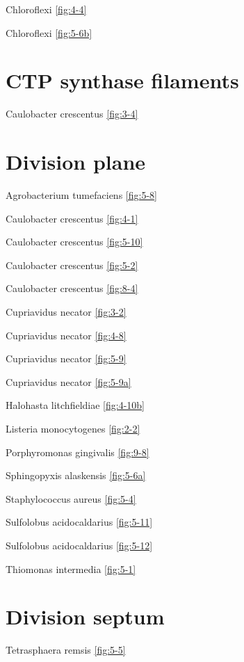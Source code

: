 \documentclass[]{tufte-book}
\begin{document}
Chloroflexi \ref{fig:4-4}

Chloroflexi \ref{fig:5-6b}

\hypertarget{ctp-synthase-filaments}{%
\section*{CTP synthase filaments}\label{ctp-synthase-filaments}}

Caulobacter crescentus \ref{fig:3-4}

\hypertarget{division-plane}{%
\section*{Division plane}\label{division-plane}}

Agrobacterium tumefaciens \ref{fig:5-8}

Caulobacter crescentus \ref{fig:4-1}

Caulobacter crescentus \ref{fig:5-10}

Caulobacter crescentus \ref{fig:5-2}

Caulobacter crescentus \ref{fig:8-4}

Cupriavidus necator \ref{fig:3-2}

Cupriavidus necator \ref{fig:4-8}

Cupriavidus necator \ref{fig:5-9}

Cupriavidus necator \ref{fig:5-9a}

Halohasta litchfieldiae \ref{fig:4-10b}

Listeria monocytogenes \ref{fig:2-2}

Porphyromonas gingivalis \ref{fig:9-8}

Sphingopyxis alaskensis \ref{fig:5-6a}

Staphylococcus aureus \ref{fig:5-4}

Sulfolobus acidocaldarius \ref{fig:5-11}

Sulfolobus acidocaldarius \ref{fig:5-12}

Thiomonas intermedia \ref{fig:5-1}

\hypertarget{division-septum}{%
\section*{Division septum}\label{division-septum}}

Tetrasphaera remsis \ref{fig:5-5}
\end{document}
